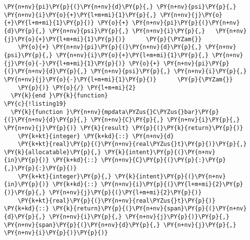 \begin{Verbatim}[commandchars=\\\{\}]
      \PY{n+nv}{pi}\PY{p}{(}\PY{n+nv}{d}\PY{p}{,} \PY{n+nv}{psi}\PY{p}{,} \PY{n+nv}{i}\PY{o}{+}\PY{l+m+mi}{1}\PY{p}{,} \PY{n+nv}{j}\PY{o}{+}\PY{l+m+mi}{1}\PY{p}{)} \PY{o}{+} \PY{n+nv}{pi}\PY{p}{(}\PY{n+nv}{d}\PY{p}{,} \PY{n+nv}{psi}\PY{p}{,} \PY{n+nv}{i}\PY{p}{,}   \PY{n+nv}{j}\PY{o}{+}\PY{l+m+mi}{1}\PY{p}{)}      \PY{p}{\PYZam{}}
    \PY{o}{+} \PY{n+nv}{pi}\PY{p}{(}\PY{n+nv}{d}\PY{p}{,} \PY{n+nv}{psi}\PY{p}{,} \PY{n+nv}{i}\PY{o}{+}\PY{l+m+mi}{1}\PY{p}{,} \PY{n+nv}{j}\PY{o}{-}\PY{l+m+mi}{1}\PY{p}{)} \PY{o}{+} \PY{n+nv}{pi}\PY{p}{(}\PY{n+nv}{d}\PY{p}{,} \PY{n+nv}{psi}\PY{p}{,} \PY{n+nv}{i}\PY{p}{,}   \PY{n+nv}{j}\PY{o}{-}\PY{l+m+mi}{1}\PY{p}{)}      \PY{p}{\PYZam{}}
    \PY{p}{)} \PY{o}{/} \PY{l+m+mi}{2}
  \PY{k}{end }\PY{k}{function}
\PY{c}{!listing19}
  \PY{k}{function }\PY{n+nv}{mpdata\PYZus{}C\PYZus{}bar}\PY{p}{(}\PY{n+nv}{d}\PY{p}{,} \PY{n+nv}{C}\PY{p}{,} \PY{n+nv}{i}\PY{p}{,} \PY{n+nv}{j}\PY{p}{)} \PY{k}{result} \PY{p}{(}\PY{k}{return}\PY{p}{)}
    \PY{k+kt}{integer} \PY{k+kd}{::} \PY{n+nv}{d}
    \PY{k+kt}{real}\PY{p}{(}\PY{n+nv}{real\PYZus{}t}\PY{p}{)}\PY{p}{,} \PY{k}{allocatable}\PY{p}{,} \PY{k}{intent}\PY{p}{(}\PY{n+nv}{in}\PY{p}{)} \PY{k+kd}{::} \PY{n+nv}{C}\PY{p}{(}\PY{p}{:}\PY{p}{,}\PY{p}{:}\PY{p}{)} 
    \PY{k+kt}{integer}\PY{p}{,} \PY{k}{intent}\PY{p}{(}\PY{n+nv}{in}\PY{p}{)} \PY{k+kd}{::} \PY{n+nv}{i}\PY{p}{(}\PY{l+m+mi}{2}\PY{p}{)}\PY{p}{,} \PY{n+nv}{j}\PY{p}{(}\PY{l+m+mi}{2}\PY{p}{)}
    \PY{k+kt}{real}\PY{p}{(}\PY{n+nv}{real\PYZus{}t}\PY{p}{)} \PY{k+kd}{::} \PY{k}{return}\PY{p}{(}\PY{n+nv}{span}\PY{p}{(}\PY{n+nv}{d}\PY{p}{,} \PY{n+nv}{i}\PY{p}{,} \PY{n+nv}{j}\PY{p}{)}\PY{p}{,} \PY{n+nv}{span}\PY{p}{(}\PY{n+nv}{d}\PY{p}{,} \PY{n+nv}{j}\PY{p}{,} \PY{n+nv}{i}\PY{p}{)}\PY{p}{)}


\end{Verbatim}

